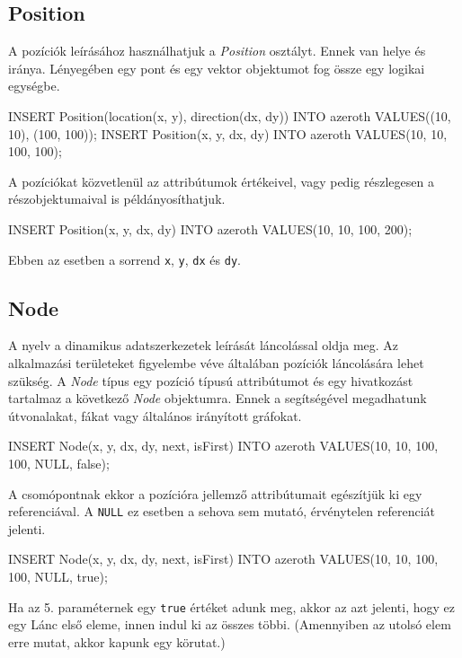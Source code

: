 \subsection{Position}

A pozíciók leírásához használhatjuk a \textit{Position} osztályt. Ennek van helye és iránya. Lényegében egy pont és egy vektor objektumot fog össze egy logikai egységbe.

\begin{sql}
INSERT Position(location(x, y), direction(dx, dy)) INTO
azeroth VALUES((10, 10), (100, 100));
INSERT Position(x, y, dx, dy) INTO azeroth VALUES(10, 10, 100, 100);
\end{sql}

A pozíciókat közvetlenül az attribútumok értékeivel, vagy pedig részlegesen a részobjektumaival is példányosíthatjuk.

\begin{sql}
INSERT Position(x, y, dx, dy) INTO azeroth VALUES(10, 10, 100, 200);
\end{sql}

Ebben az esetben a sorrend \texttt{x}, \texttt{y}, \texttt{dx} és \texttt{dy}. 


\subsection{Node}

A nyelv a dinamikus adatszerkezetek leírását láncolással oldja meg. Az alkalmazási területeket figyelembe véve általában pozíciók láncolására lehet szükség. A \textit{Node} típus egy pozíció típusú attribútumot és egy hivatkozást tartalmaz a következő \textit{Node} objektumra. Ennek a segítségével megadhatunk útvonalakat, fákat vagy általános irányított gráfokat.

\begin{sql}
INSERT Node(x, y, dx, dy, next, isFirst) INTO 
azeroth VALUES(10, 10, 100, 100, NULL, false);
\end{sql}

A csomópontnak ekkor a pozícióra jellemző attribútumait egészítjük ki egy referenciával. A \texttt{NULL} ez esetben a sehova sem mutató, érvénytelen referenciát jelenti.


\begin{sql}
INSERT Node(x, y, dx, dy, next, isFirst) INTO 
azeroth VALUES(10, 10, 100, 100, NULL, true);
\end{sql}

Ha az 5. paraméternek egy \texttt{true} értéket adunk meg, akkor az azt jelenti, hogy ez egy Lánc első eleme, innen indul ki az összes többi. (Amennyiben az utolsó elem erre mutat, akkor kapunk egy körutat.)

